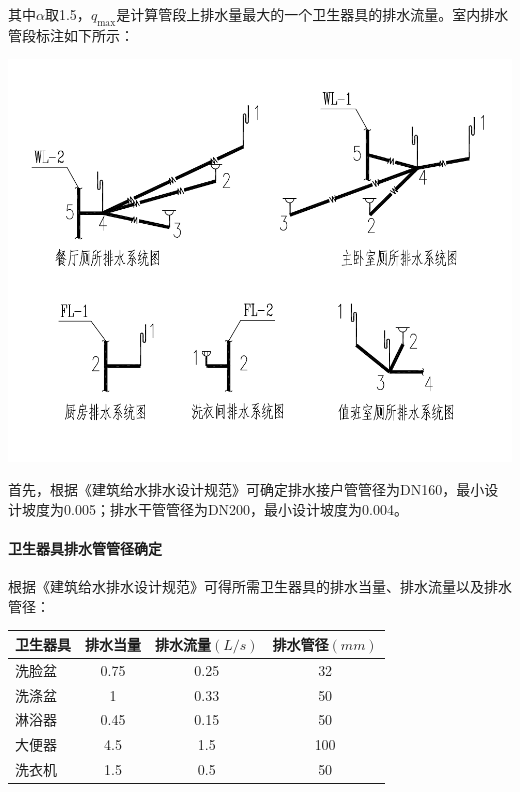 \documentclass{gdutart}
\begin{document}
        其中$\alpha$取1.5，$q_{\max}$是计算管段上排水量最大的一个卫生器具的排水流量。室内排水管段标注如下所示：
        \begin{center}
          \includegraphics[scale=0.8]{affix/tubes_2.pdf}
        \end{center}

        首先，根据《建筑给水排水设计规范》可确定排水接户管管径为DN160，最小设计坡度为0.005；排水干管管径为DN200，最小设计坡度为0.004。

        \paragraph{卫生器具排水管管径确定}
          根据《建筑给水排水设计规范》可得所需卫生器具的排水当量、排水流量以及排水管径：
          \begin{center}
            \begin{tabularx}{\textwidth}{|Y|c|c|c|}
              \hline
              卫生器具 & 排水当量 & 排水流量$(L/s)$ & 排水管径$(mm)$ \bigstrut\\
              \hline
              洗脸盆   & 0.75  & 0.25  & 32 \bigstrut\\
              \hline
              洗涤盆   & 1     & 0.33  & 50 \bigstrut\\
              \hline
              淋浴器   & 0.45  & 0.15  & 50 \bigstrut\\
              \hline
              大便器   & 4.5   & 1.5   & 100 \bigstrut\\
              \hline
              洗衣机 & 1.5   & 0.5   & 50 \bigstrut\\
              \hline
            \end{tabularx}
          \end{center}
\end{document}
